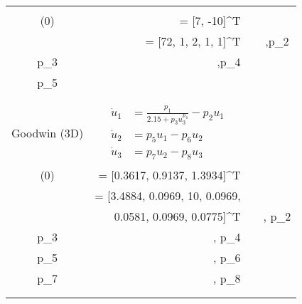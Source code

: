 \begin{table}[H]
{\begin{tabular}{crcc}
\begin{minipage}{5cm}
\begin{aligned}
		t &\in [0,60]\\
		\state(0) &= [7, -10]^T \\
		\trueParams  &= [72, 1, 2, 1, 1]^T
		\end{aligned} \)
	\end{minipage} & \begin{minipage}{4cm} \(\begin{aligned}
		p_1&\in [60,80],\;p_2\in [1,3]\\
		p_3&\in [0.5,3],\;p_4\in [0.5,3]\\
		p_5&\in [0.5,3]
	\end{aligned}\) \end{minipage}\\\\[-5pt]
	\hline 
	\\[-5pt]
	Goodwin (3D) & \begin{minipage}{5cm} 
		\begin{equation} \label{eq:goodwin3d}
			\begin{aligned}
			\dot{u}_1 &= \frac{p_1}{2.15 + p_3 u_3^{p_4}} - p_2  u_1 \\
			\dot{u}_2 &= p_5u_1- p_6u_2 \\
			\dot{u}_3 &= p_7u_2-p_8u_3
			\end{aligned}
		\end{equation}
	\end{minipage} & 
	\begin{minipage}{5.5cm}
		\(\begin{aligned}
			t &\in [0,80]\\
			\state(0) &= [0.3617, 0.9137, 1.3934]^T \\
			\trueParams &= [3.4884, 0.0969, 10, 0.0969, \\
			&\hspace{0.25cm}  0.0581, 0.0969, 0.0775]^T
		\end{aligned} \)
	\end{minipage} & \begin{minipage}{4cm} \(\begin{aligned}
		p_1 &\in [1,5], \; p_2\in[0,0.2] \\
		p_3 &\in [0,2], \; p_4\in[5, 15] \\
		p_5 &\in [0,0.2], \; p_6\in[0,0.2] \\
		p_7 &\in [0,0.2], \; p_8\in[0,0.2] \\
	\end{aligned}\) \end{minipage}\\\\[-10pt]

\end{tabular}}
\end{table}
